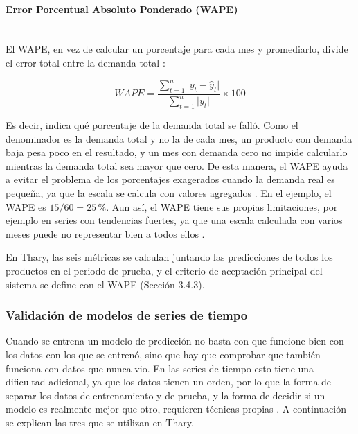 \paragraph{Error Porcentual Absoluto Ponderado (WAPE)}\mbox{}\\
El WAPE, en vez de calcular un porcentaje para cada mes y promediarlo, divide el error total entre la demanda total \cite{hewamalage2023evaluation}:

\begin{equation}
WAPE = \frac{\sum_{t=1}^{n} \lvert y_t - \hat{y}_t \rvert}{\sum_{t=1}^{n} \lvert y_t \rvert} \times 100
\end{equation}

Es decir, indica qué porcentaje de la demanda total se falló. Como el denominador es la demanda total y no la de cada mes, un producto con demanda baja pesa poco en el resultado, y un mes con demanda cero no impide calcularlo mientras la demanda total sea mayor que cero. De esta manera, el WAPE ayuda a evitar el problema de los porcentajes exagerados cuando la demanda real es pequeña, ya que la escala se calcula con valores agregados \cite{hewamalage2023evaluation}. En el ejemplo, el WAPE es $15/60 = 25\,\%$. Aun así, el WAPE tiene sus propias limitaciones, por ejemplo en series con tendencias fuertes, ya que una escala calculada con varios meses puede no representar bien a todos ellos \cite{hewamalage2023evaluation}.

En Thary, las seis métricas se calculan juntando las predicciones de todos los productos en el periodo de prueba, y el criterio de aceptación principal del sistema se define con el WAPE (Sección 3.4.3).

\subsubsection{Validación de modelos de series de tiempo}

Cuando se entrena un modelo de predicción no basta con que funcione bien con los datos con los que se entrenó, sino que hay que comprobar que también funciona con datos que nunca vio. En las series de tiempo esto tiene una dificultad adicional, ya que los datos tienen un orden, por lo que la forma de separar los datos de entrenamiento y de prueba, y la forma de decidir si un modelo es realmente mejor que otro, requieren técnicas propias \cite{hewamalage2023evaluation}. A continuación se explican las tres que se utilizan en Thary.


